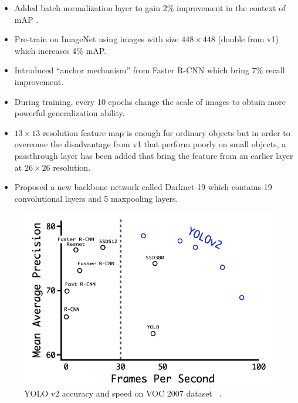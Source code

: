 \begin{itemize}
    \item Added batch normalization layer to gain 2\% improvement in the 
    context of mAP .

    \item Pre-train on ImageNet using images with size $448 \times
    448$ (double from v1) which increases 4\% mAP.

    \item Introduced ``anchor mechanism'' from Faster R-CNN which
    bring 7\% recall improvement.

    \item During training, every 10 epochs change the scale of images to obtain
    more powerful generalization ability.

    \item $13 \times 13$ resolution feature map is enough for ordinary objects
    but in order to overcome the disadvantage from v1 that perform poorly on
    small objects, a passthrough layer has been added that bring the feature
    from an earlier layer at $26 \times 26$ resolution.

    \item Proposed a new backbone network called Darknet-19 which contains 19
    convolutional layers and 5 maxpooling layers.
\end{itemize}

\begin{figure}
    \begin{center}
    \includegraphics[scale=0.7]{figures/yolov2_speed_and_acc.png}
    \end{center}
    \caption{YOLO v2 accuracy and speed on VOC 2007 dataset
    ~\protect\cite{yolov2-paper-2016}.}
    \label{fig:yolo-v2-s-acc}
\end{figure}

